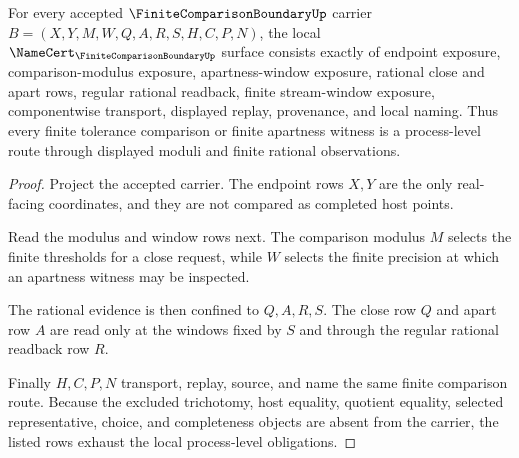 \begin{theorem}
\label{thm:finite-comparison-boundary-process-level-obligations}
For every accepted $\FiniteComparisonBoundaryUp$ carrier $B=(X,Y,M,W,Q,A,R,S,H,C,P,N)$, the local $\NameCert_{\FiniteComparisonBoundaryUp}$ surface consists exactly of endpoint exposure, comparison-modulus exposure, apartness-window exposure, rational close and apart rows, regular rational readback, finite stream-window exposure, componentwise transport, displayed replay, provenance, and local naming. Thus every finite tolerance comparison or finite apartness witness is a process-level route through displayed moduli and finite rational observations.
\end{theorem}
\begin{proof}
Project the accepted carrier. The endpoint rows $X,Y$ are the only real-facing coordinates, and they are not compared as completed host points.

Read the modulus and window rows next. The comparison modulus $M$ selects the finite thresholds for a close request, while $W$ selects the finite precision at which an apartness witness may be inspected.

The rational evidence is then confined to $Q,A,R,S$. The close row $Q$ and apart row $A$ are read only at the windows fixed by $S$ and through the regular rational readback row $R$.

Finally $H,C,P,N$ transport, replay, source, and name the same finite comparison route. Because the excluded trichotomy, host equality, quotient equality, selected representative, choice, and completeness objects are absent from the carrier, the listed rows exhaust the local process-level obligations.
\end{proof}

